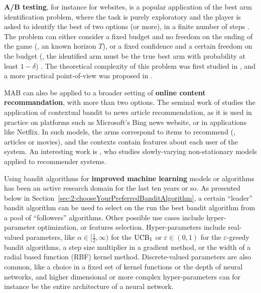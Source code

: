%
    \textbf{A/B testing}, for instance for websites, is a popular application of the best arm identification problem,
    where the task is purely exploratory and the player is asked to identify the best of two options (or more), in a finite number of steps \cite{audibert2010best}.
    The problem can either consider a fixed budget and no freedom on the ending of the game (\ie, an known horizon $T$), or a fixed confidence and a certain freedom on the budget (\ie, the identified arm must be the true best arm with probability at least $1-\delta$) \cite{Garivier16BAI}.
    The theoretical complexity of this problem
    was first studied in \cite{Kaufmann14},
    and a more practical point-of-view was proposed in \cite{Jamieson17ABTest}.

    MAB can also be applied to a broader setting of \textbf{online content recommandation},
    with more than two options.
    The seminal work of \cite{Li10} studies the application of contextual bandit to news article recommendation, as it is used in practice on platforms such as Microsoft's Bing news website,
    or in applications like Netflix.
    In such models, the arms correspond to items to recommend (\eg, articles or movies), and the contexts contain features about each user of the system.
    An interesting work is \cite{Louedec16}, who studies slowly-varying non-stationary models applied to recommender systems.

    Using bandit algorithms for \textbf{improved machine learning} models or algorithms has been an active research domain for the last ten years or so.
    As presented below in Section~\ref{sec:2:chooseYourPreferredBanditAlgorithm}, a certain ``leader'' bandit algorithm can be used to select on the run the best bandit algorithm from a pool of ``followers'' algorithms.
    Other possible use cases include hyper-parameter optimization, or features selection.
    Hyper-parameters include real-valued parameters, like $\alpha\in[\frac{1}{2},\infty)$ for the $\mathrm{UCB}_1$ or $\varepsilon\in(0,1)$ for the $\varepsilon$-greedy bandit algorithms, a step size multiplier in a gradient method, or the width of a radial based function (RBF) kernel method.
    Discrete-valued parameters are also common, like a choice in a fixed set of kernel functions or the depth of neural networks,
    and higher dimensional or more complex hyper-parameters can for instance be the entire architecture of a neural network.


